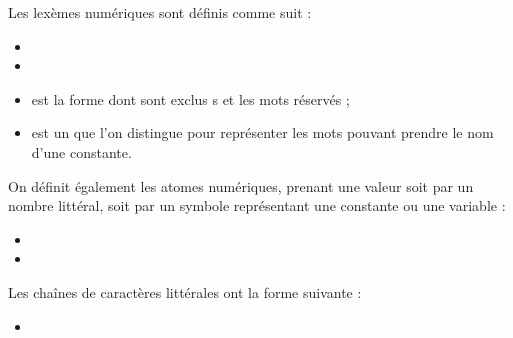 \documentclass[letterpaper,10pt,french]{sphinxmanual}
\begin{document}
\sphinxAtStartPar
Les lexèmes numériques sont définis comme suit :
\begin{itemize}
\item {} 
\sphinxAtStartPar
{}

\item {} 
\sphinxAtStartPar
{}

\item {} 
\sphinxAtStartPar
{} est la forme  dont sont exclus s et
les mots réservés ;

\item {} 
\sphinxAtStartPar
{} est un  que l’on distingue pour représenter les
mots pouvant prendre le nom d’une constante.

\end{itemize}

\sphinxAtStartPar
On définit également les atomes numériques, prenant une valeur soit par un
nombre littéral, soit par un symbole représentant une constante ou une
variable :
\begin{itemize}
\item {} 
\sphinxAtStartPar
{}

\item {} 
\sphinxAtStartPar
{}

\end{itemize}

\sphinxAtStartPar
Les chaînes de caractères littérales ont la forme suivante :
\begin{itemize}
\item {} 
\sphinxAtStartPar
{}

\end{itemize}
\end{document}
